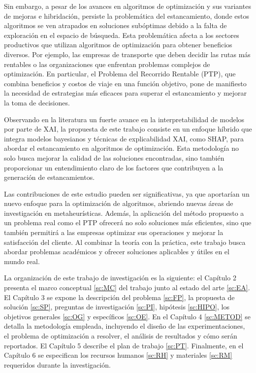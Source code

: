 Sin embargo, a pesar de los avances en algoritmos de optimización y sus variantes de mejoras e hibridación, persiste la problemática del estancamiento, donde estos algoritmos se ven atrapados en soluciones subóptimas debido a la falta de exploración en el espacio de búsqueda. Esta problemática afecta a los sectores productivos que utilizan algoritmos de optimización para obtener beneficios diversos. Por ejemplo, las empresas de transporte que deben decidir las rutas más rentables o las organizaciones que enfrentan problemas complejos de optimización. En particular, el Problema del Recorrido Rentable (PTP), que combina beneficios y costos de viaje en una función objetivo, pone de manifiesto la necesidad de estrategias más eficaces para superar el estancamiento y mejorar la toma de decisiones.

Observando en la literatura un fuerte avance en la interpretabilidad de modelos por parte de XAI, la propuesta de este trabajo consiste en un enfoque híbrido que integra modelos bayesianos y técnicas de explicabilidad XAI, como SHAP, para abordar el estancamiento en algoritmos de optimización. Esta metodología no solo busca mejorar la calidad de las soluciones encontradas, sino también proporcionar un entendimiento claro de los factores que contribuyen a la generación de estancamientos.

Las contribuciones de este estudio pueden ser significativas, ya que aportarían un nuevo enfoque para la optimización de algoritmos, abriendo nuevas áreas de investigación en metaheurísticas. Además, la aplicación del método propuesto a un problema real como el PTP ofrecerá no solo soluciones más eficientes, sino que también permitirá a las empresas optimizar sus operaciones y mejorar la satisfacción del cliente. Al combinar la teoría con la práctica, este trabajo busca abordar problemas académicos y ofrecer soluciones aplicables y útiles en el mundo real.


La organización de este trabajo de investigación es la siguiente: el Capítulo 2 presenta el marco conceptual \ref{sc:MC} del trabajo junto al estado del arte \ref{sc:EA}. El Capítulo 3 se expone la descripción del problema \ref{sc:FP}, la propuesta de solución \ref{sc:SP}, preguntas de investigación \ref{sc:PI}, hipótesis \ref{sc:HIPO}, los objetivos generales \ref{sc:OG} y específicos \ref{sc:OE}. En el Capítulo 4 \ref{sc:METOD} se detalla la metodología empleada, incluyendo el diseño de las experimentaciones, el problema de optimización a resolver, el análisis de resultados y cómo serán reportados. El Capítulo 5 describe el plan de trabajo \ref{sc:PT}. Finalmente, en el Capítulo 6 se especifican los recursos humanos \ref{sc:RH} y materiales \ref{sc:RM} requeridos durante la investigación.
